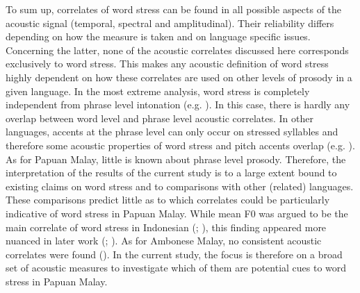 To sum up, correlates of word stress can be found in all possible aspects of the acoustic signal (temporal, spectral and amplitudinal). Their reliability differs depending on how the measure is taken and on language specific issues. Concerning the latter, none of the acoustic correlates discussed here corresponds exclusively to word stress. This makes any acoustic definition of word stress highly dependent on how these correlates are used on other levels of prosody in a given language. In the most extreme analysis, word stress is completely independent from phrase level intonation (e.g. \citealt{lindstrom_aspects_2005}). In this case, there is hardly any overlap between word level and phrase level acoustic correlates. In other languages, accents at the phrase level can only occur on stressed syllables and therefore some acoustic properties of word stress and pitch accents overlap (e.g. \citealt{sluijter_spectral_1996}). As for Papuan Malay, little is known about phrase level prosody. Therefore, the interpretation of the results of the current study is to a large extent bound to existing claims on word stress and to comparisons with other (related) languages. These comparisons predict little as to which correlates could be particularly indicative of word stress in Papuan Malay. While mean F0 was argued to be the main correlate of word stress in Indonesian (\citealt{halim_intonation_1981}; \citealt{laksman_location_1994}), this finding appeared more nuanced in later work (\citealt{goedemans_stress_2007}; \citealt{goedemans_no_2014}). As for Ambonese Malay, no consistent acoustic correlates were found (\citealt{maskikit-essed_no_2016}). In the current study, the focus is therefore on a broad set of acoustic measures to investigate which of them are potential cues to word stress in Papuan Malay.

